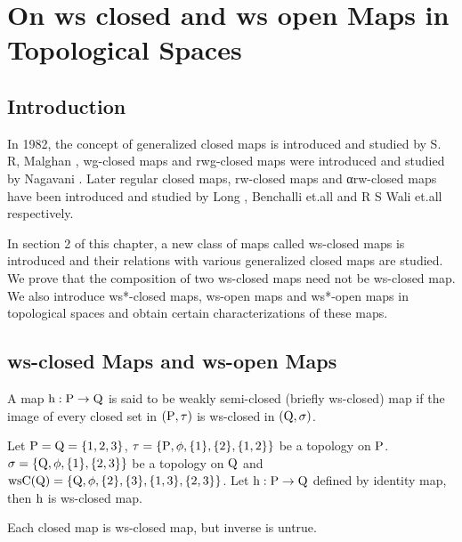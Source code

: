 \chapter{On ws closed and ws open Maps in Topological Spaces}
\graphicspath{{Chapter4/Chapter4Figs/EPS/}{Chapter4/Chapter4Figs/}}

\section{Introduction}\label{sec4.1}

In 1982, the concept of generalized closed maps is introduced and studied by S. R, Malghan \cite{key23}, wg-closed maps and rwg-closed maps were introduced and studied by Nagavani \cite{key26}. Later regular closed maps, rw-closed maps and αrw-closed maps have been introduced and studied by Long \cite{key20}, Benchalli et.all \cite{key8} and R S Wali et.all \cite{key35} respectively. 

In section 2 of this chapter, a new class of maps called ws-closed maps is introduced and their relations with various generalized closed maps are studied. We prove that the composition of two ws-closed maps need not be ws-closed map. We also introduce ws*-closed maps, ws-open maps and ws*-open maps in topological spaces and obtain certain characterizations of these maps.

\section{ws-closed Maps and ws-open Maps}\label{sec4.2}

\begin{dfn}\label{defi4.2.1} 
A map $\mathrm{h}: \mathrm{P} \to \mathrm{Q}$ is said to be weakly semi-closed (briefly ws-closed) map if the image of every closed set in $(\mathrm{P}, \tau)$ is ws-closed in $(\mathrm{Q}, \sigma)$.
\end{dfn}

\begin{exm}\label{exam4.2.2}
Let $\mathrm{P} = \mathrm{Q} = \{1, 2, 3\}$, $\tau = \{\mathrm{P}, \phi, \{1\}, \{2\}, \{1, 2\}\}$ be a topology on $\mathrm{P}$.
$\sigma = \{\mathrm{Q}, \phi, \{1\}, \{2, 3\}\}$ be a topology on $\mathrm{Q}$ and $\ws\TSC(\TSQ) =\{\TSQ, \phi, \{2\},\{3\},\{1,3\},\break \{2, 3\}\}$. Let $\mathrm{h}: \mathrm{P} \to \mathrm{Q}$ defined by identity map, then $\mathrm{h}$ is ws-closed map.
\end{exm}

\begin{thm}\label{thm4.2.3}
Each closed map is ws-closed map, but inverse is untrue.
\end{thm}

